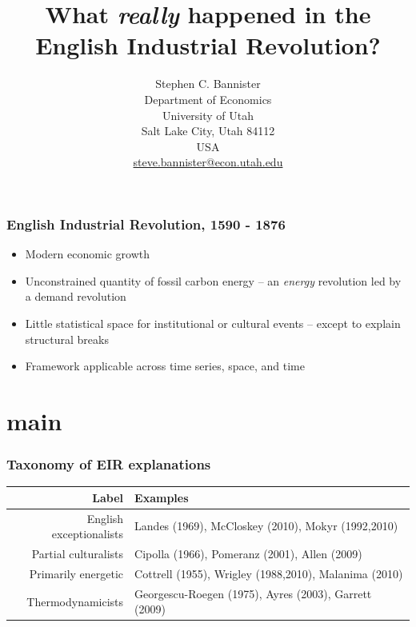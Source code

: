 \documentclass[final]{beamer}
\title{What \textit{really} happened in the English Industrial Revolution?} %
\author{Stephen C. Bannister\\
	Department of Economics\\
	University of Utah\\
	Salt Lake City, Utah 84112\\
	USA\\
	\href{mailto:steve.bannister@econ.utah.edu}{steve.bannister@econ.utah.edu}\\
	}
\date{}
\begin{document}

	\maketitle
	\nocite{*}
%	

	
%	

\begin{frame}
\frametitle{English Industrial Revolution, 1590 - 1876}

	\begin{itemize}
	\item Modern economic growth
	\item Unconstrained quantity of fossil carbon energy -- an \textit{energy} revolution led by a demand revolution
	\item Little statistical space for institutional or cultural events -- except to explain structural breaks
	\item Framework applicable across time series, space, and time
	\end{itemize}
\end{frame}

\section{main}

\begin{frame}
\frametitle{Taxonomy of EIR explanations}
\footnotesize{
\begin{table}[p!]
\label{tbl:taxonomy}
\begin{tabular}{rl}
Label&Examples\\
\hline
English exceptionalists&Landes (1969), McCloskey (2010), Mokyr (1992,2010)\\
Partial culturalists&Cipolla (1966), Pomeranz (2001), Allen (2009)\\
Primarily energetic&Cottrell (1955), Wrigley (1988,2010), Malanima (2010)\\
Thermodynamicists&Georgescu-Roegen (1975), Ayres (2003), Garrett (2009)\\
\end{tabular}
\end{table}
}
\end{frame}
\end{document}
